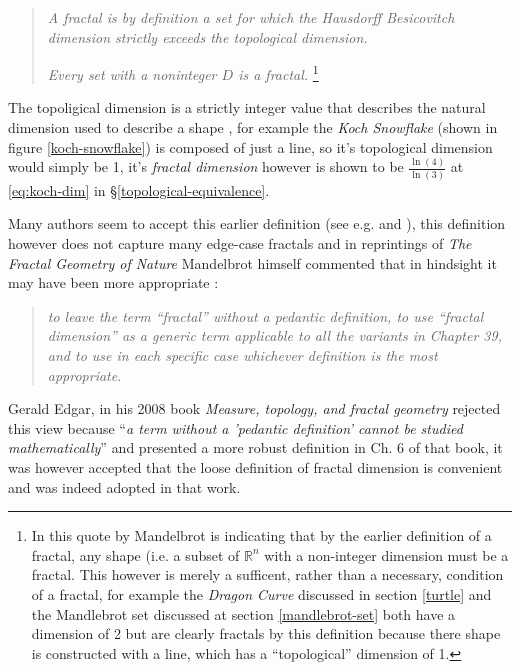 \documentclass[a4paper,11pt,twoside]{article}
\begin{document}
\begin{quote}
\emph{A fractal is by definition a set for which the Hausdorff Besicovitch dimension
strictly exceeds the topological dimension.}

\emph{Every set with a noninteger \(D\) is a fractal.} \footnote{In this quote by Mandelbrot is indicating that by the earlier definition of a
fractal, any shape (i.e. a subset of \(\mathbb{R}^{n}\) with a non-integer
dimension must be a fractal. This however is merely a sufficent, rather than a
necessary, condition of a fractal, for example the \emph{Dragon Curve} discussed in
section \ref{turtle} and the Mandlebrot set discussed at section \ref{mandlebrot-set} both
have a dimension of 2 but are clearly fractals by this definition because there
shape is constructed with a line, which has a ``topological'' dimension of 1.}
\end{quote}

The topoligical dimension is a strictly integer value that describes the natural dimension used to describe a shape \cite{sandersonFractalsAreTypically2017},
for example the \emph{Koch Snowflake} (shown in figure \ref{koch-snowflake}) is composed of
just a line, so it's topological dimension would simply be 1, it's \emph{fractal
dimension} however is shown to be \(\frac{\ln\left( 4 \right)}{\ln\left( 3
\right)}\) at \eqref{eq:koch-dim} in \S\ref{topological-equivalence}.

Many authors seem to accept this earlier definition (see e.g. \cite[\S2.2]{vicsekFractalGrowthPhenomena1992} and \cite[\S2.1]{telChaoticDynamicsIntroduction2006}),
this definition however does not capture many edge-case fractals
 \cite[VII]{edgarMeasureTopologyFractal2008a} and in reprintings of \emph{The
Fractal Geometry of Nature} Mandelbrot himself commented that in hindsight it
may have been more appropriate \cite[p. 459]{mandelbrotFractalGeometryNature1982}:

\begin{quote}
\emph{to leave the term ``fractal” without a pedantic definition, to use “fractal dimension” as a generic term applicable to all the variants in Chapter 39, and to use in each specific case whichever definition is the most appropriate}.
\end{quote}

Gerald Edgar, in his 2008 book \emph{Measure, topology, and fractal geometry}
rejected this view because ``\emph{a term without a 'pedantic definition' cannot be
studied mathematically}'' \cite[VII]{edgarMeasureTopologyFractal2008a} and
presented a more robust definition in Ch. 6 of that book, it was however
accepted that the loose definition of fractal dimension is convenient and was
indeed adopted in that work.
\end{document}

